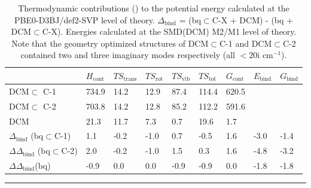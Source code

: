 \documentclass[../../main.tex]{subfiles}
\begin{document}
\begin{table}[h!]
	\def\arraystretch{1.7}
	\begin{tabularx}{\textwidth}{YYYYYYYYY}
		\hline	
		&$H_\text{cont}$&	$TS_\text{trans}$	&$TS_\text{rot}	$&$TS_\text{vib}$&	$TS_\text{tot}$&$G_\text{cont}$  & $E_\text{bind}$ & $G_\text{bind}$  \\
		\hline
		
		{\small{DCM$\subset$
				C-1}}	&	734.9&	14.2&	12.9&	87.4&	114.4&	620.5	&&	
\\
		{\small{DCM$\subset$
				C-2}}		&	703.8&	14.2&	12.8&	85.2&	112.2&	591.6	&&	
\\
		{\small{DCM}}	                         & 21.3		&	11.7&	7.3	&0.7&	19.6&	1.7	&&	
\\
		{\small{$\Delta_\text{bind}$
				(bq$\subset$C-1)}}&	1.1	&-0.2	&-1.0&	0.7	&-0.5&	1.6  &	-3.0&	-1.4
\\
		{\small{$\Delta\Delta_\text{bind}$ 
				(bq$\subset$C-2)}}&	2.0	&-0.2&	-1.0&	1.5&	0.3&	1.6	&-4.8&	-3.2
\\
		{\small{$\Delta\Delta_\text{bind}$(bq)}}&		-0.9&	0.0	&0.0&	-0.9&	-0.9&	0.0&	-1.8&	-1.8
	
		
	\end{tabularx}
	\hrule
	\vspace{0.2cm}
	\caption{Thermodynamic contributions (\kcal) to the potential energy calculated at the PBE0-D3BJ/def2-SVP level of theory. $\Delta_\text{bind}$ = (bq$\subset$C-X + DCM) - (bq + DCM$\subset$C-X). Energies calculated at the SMD(DCM) M2/M1 level of theory. Note that the geometry optimized structures of DCM$\subset$C-1 and DCM$\subset$C-2 contained two and three imaginary modes respectively (all $<20$i cm$^{-1}$).}
	\label{table::si_da_7}
\end{table}
\end{document}

